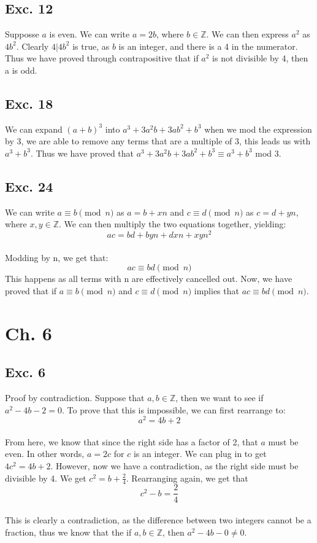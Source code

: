 \documentclass[12pt]{article}
\begin{document}
\subsection*{Exc. 12}
Supposse $a$ is even. We can write $a = 2b$, where $b \in \mathbb{Z}$. We can then express $a^2$
as $4b^2$. Clearly $4|4b^2$ is true, as $b$ is an integer, and there is a 4 in the numerator.
Thus we have proved through contrapositive that if $a^2$ is not divisible by 4, then a is odd.

\subsection*{Exc. 18}
We can expand $(a+b)^3$ into $a^3 + 3a^{2}b+3ab^2+b^3$ when we mod the expression by $3$, we are able 
to remove any terms that are a multiple of $3$, this leads us with $a^3 + b^3$. Thus we have proved that
$a^3 + 3a^{2}b+3ab^2+b^3 \equiv a^3 + b^3$ mod 3.

\subsection*{Exc. 24}
We can write $a \equiv b \pmod{n}$ as $a = b + xn$ and $c \equiv d \pmod{n}$ as $c = d + yn$, where $x,y \in \mathbb{Z}$.
We can then multiply the two equations together, yielding:
$$ac = bd + byn + dxn + xyn^2$$ \\
Modding by n, we get that:
$$ac \equiv bd \pmod{n}$$
This happens as all terms with n are effectively cancelled out. Now, we have proved that if
$a \equiv b \pmod{n}$ and $c \equiv d \pmod{n}$ implies that $ac \equiv bd \pmod{n}$.

\section*{Ch. 6}

\subsection*{Exc. 6}
Proof by contradiction. Suppose that $a, b \in \mathbb{Z}$, then we want to see if $a^2-4b-2 = 0$.
To prove that this is impossible, we can first rearrange to: 
$$a^2 = 4b+2$$\\
From here, we know that since the right side has a factor of 2, that $a$ must be even. In other words,
$a = 2c$ for $c$ is an integer. We can plug in to get $4c^2 = 4b + 2$. However, now we have a contradiction,
as the right side must be divisible by 4. We get $c^2 = b + \frac{2}{4}$. Rearranging again, we get that 
$$c^2 - b = \frac{2}{4}$$ \\
This is clearly a contradiction, as the difference between two integers cannot be a fraction, thus 
we know that the if $a, b \in \mathbb{Z}$, then $a^2 -4b -0 \ne 0$.
\end{document}

